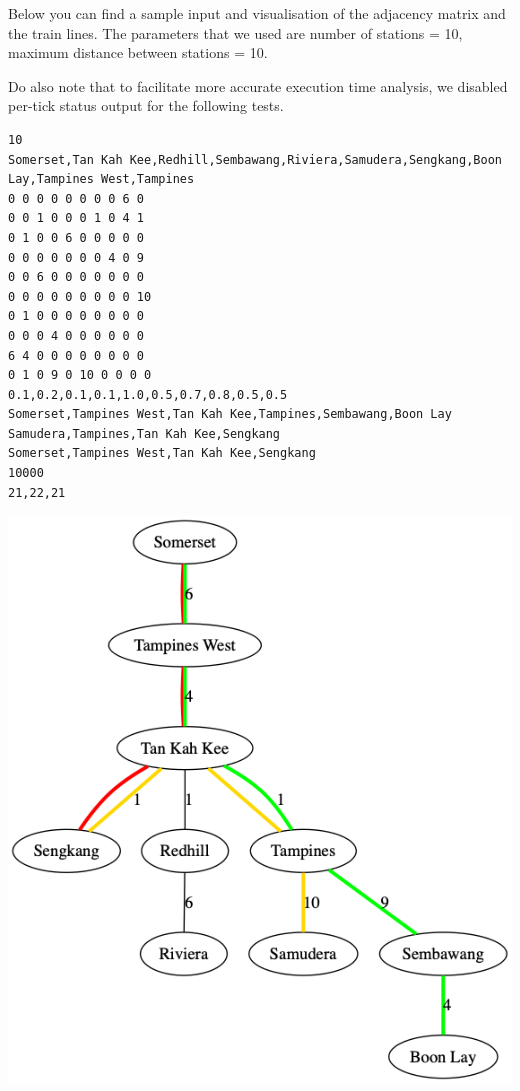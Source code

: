\documentclass[a4paper,12pt]{article}
\begin{document}
	Below you can find a sample input and visualisation of the adjacency matrix and the train lines. The parameters that we used are number of stations = 10, maximum distance between stations = 10.
	
	Do also note that to facilitate more accurate execution time analysis, we disabled per-tick status output for the following tests.
	
	\begin{center}
		\begin{verbatim}
10
Somerset,Tan Kah Kee,Redhill,Sembawang,Riviera,Samudera,Sengkang,Boon Lay,Tampines West,Tampines
0 0 0 0 0 0 0 0 6 0
0 0 1 0 0 0 1 0 4 1
0 1 0 0 6 0 0 0 0 0
0 0 0 0 0 0 0 4 0 9
0 0 6 0 0 0 0 0 0 0
0 0 0 0 0 0 0 0 0 10
0 1 0 0 0 0 0 0 0 0
0 0 0 4 0 0 0 0 0 0
6 4 0 0 0 0 0 0 0 0
0 1 0 9 0 10 0 0 0 0
0.1,0.2,0.1,0.1,1.0,0.5,0.7,0.8,0.5,0.5
Somerset,Tampines West,Tan Kah Kee,Tampines,Sembawang,Boon Lay
Samudera,Tampines,Tan Kah Kee,Sengkang
Somerset,Tampines West,Tan Kah Kee,Sengkang
10000
21,22,21
		\end{verbatim}
	\end{center}
	
	\begin{center}
		\includegraphics[width=0.5\linewidth]{map}
	\end{center}

	\newpage
\end{document}

